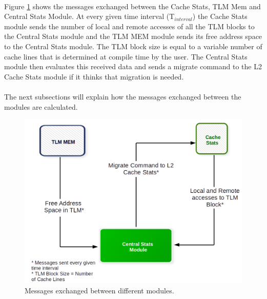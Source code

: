 \documentclass{listhesis}
\begin{document}
\\
Figure \ref{fig:approachOfSolution} shows the messages exchanged between the Cache Stats, TLM Mem and Central Stats Module. At every given time interval (T$_{interval}$) the Cache Stats module sends the number of local and remote accesses of all the TLM blocks to the Central Stats module and the TLM MEM module sends its free address space to the Central Stats module. The TLM block size is equal to a variable number of cache lines that is determined at compile time by the user. The Central Stats module then evaluates this received data and sends a migrate command to the L2 Cache Stats module if it thinks that migration is needed. \\
\\
The next subsections will explain how the messages exchanged between the modules are calculated. 
\begin{figure}
  \includegraphics[width=0.8\linewidth]{approachOfSolution.png}
  \centering
  \caption{Messages exchanged between different modules.}
  \label{fig:approachOfSolution}
\end{figure}
\end{document}
